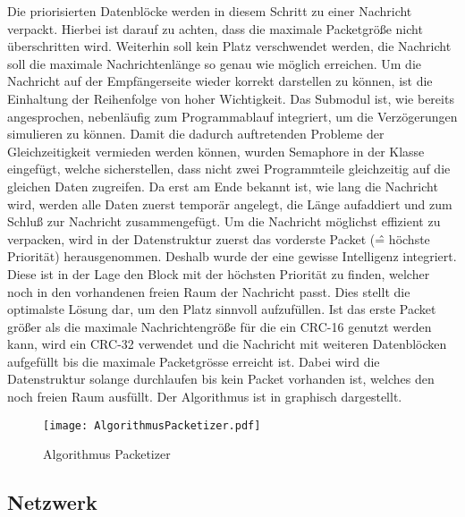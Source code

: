 Die priorisierten Datenbl{\"o}cke werden in diesem Schritt zu einer Nachricht
verpackt. Hierbei ist darauf zu achten, dass die maximale Packetgr{\"o}{\ss}e
nicht {\"u}berschritten wird. Weiterhin soll kein Platz verschwendet werden, \dahe
die Nachricht soll die maximale Nachrichtenl{\"a}nge so genau wie m{\"o}glich erreichen.
Um die Nachricht auf der Empf{\"a}ngerseite wieder korrekt darstellen zu k{\"o}nnen, ist
die Einhaltung der Reihenfolge von hoher Wichtigkeit. \newline
Das Submodul ist, wie bereits angesprochen, nebenl{\"a}ufig zum Programmablauf
integriert, um die Verz{\"o}gerungen simulieren zu k{\"o}nnen. Damit die
dadurch auftretenden Probleme der Gleichzeitigkeit vermieden werden k{\"o}nnen,
wurden Semaphore in der Klasse 
eingef{\"u}gt, welche sicherstellen, dass nicht zwei Programmteile gleichzeitig auf
die gleichen Daten zugreifen. Da erst am Ende bekannt ist, wie lang die
Nachricht wird, werden alle Daten zuerst tempor{\"a}r angelegt, die L{\"a}nge aufaddiert
und zum Schlu{\ss} zur Nachricht zusammengef{\"u}gt.
Um die Nachricht m{\"o}glichst effizient zu verpacken, wird in der
Datenstruktur  zuerst das vorderste Packet
(\^= h{\"o}chste Priorit{\"a}t) herausgenommen. Deshalb wurde der
 eine gewisse Intelligenz integriert.
Diese ist in der Lage den Block mit der h{\"o}chsten Priorit{\"a}t zu finden, welcher
noch in den vorhandenen freien Raum der Nachricht passt. Dies stellt die
optimalste L{\"o}sung dar, um den Platz sinnvoll aufzuf{\"u}llen. \newline 
Ist das erste Packet gr{\"o}{\ss}er als die maximale Nachrichtengr{\"o}{\ss}e f{\"u}r die ein CRC-16
genutzt werden kann, wird ein CRC-32 verwendet und die Nachricht mit weiteren
Datenbl{\"o}cken aufgef{\"u}llt bis die maximale Packetgr{\"o}sse erreicht ist. Dabei wird
die Datenstruktur  solange
durchlaufen bis kein Packet vorhanden ist, welches den noch freien Raum
ausf{\"u}llt. \newline 
Der Algorithmus ist in  graphisch dargestellt.

\begin{figure}[H]
\centering
\texttt{[image: AlgorithmusPacketizer.pdf]}
\caption{Algorithmus Packetizer}
\label{fig:AlgorithmusPacketizer}
\end{figure}

\subsection{Netzwerk}

